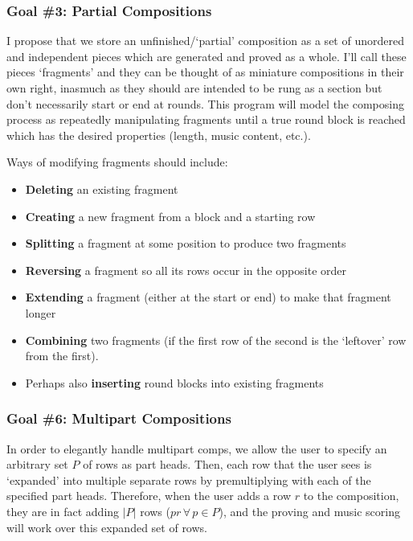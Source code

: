 \documentclass[12pt]{article}
\begin{document}
\subsubsection{Goal \#3: Partial Compositions}

I propose that we store an unfinished/`partial' composition as a set of unordered and independent
pieces which are generated and proved as a whole.  I'll call these pieces `fragments' and they can
be thought of as miniature compositions in their own right, inasmuch as they should are intended to
be rung as a section but don't necessarily start or end at rounds.  This program will model the
composing process as repeatedly manipulating fragments until a true round block is reached which has
the desired properties (length, music content, etc.).

Ways of modifying fragments should include:

\begin{itemize}
    \item \textbf{Deleting} an existing fragment
    \item \textbf{Creating} a new fragment from a block and a starting row
    \item \textbf{Splitting} a fragment at some position to produce two fragments
    \item \textbf{Reversing} a fragment so all its rows occur in the opposite order
    \item \textbf{Extending} a fragment (either at the start or end) to make that fragment longer
    \item \textbf{Combining} two fragments (if the first row of the second is the `leftover' row
        from the first).
    \item Perhaps also \textbf{inserting} round blocks into existing fragments
\end{itemize}

\subsubsection{Goal \#6: Multipart Compositions}

In order to elegantly handle multipart comps, we allow the user to specify an arbitrary set $P$ of
rows as part heads.  Then, each row that the user sees is `expanded' into multiple separate rows by
premultiplying with each of the specified part heads.  Therefore, when the user adds a row $r$ to
the composition, they are in fact adding $|P|$ rows ($pr \, \forall \, p \in P$), and the proving
and music scoring will work over this expanded set of rows.
\end{document}
